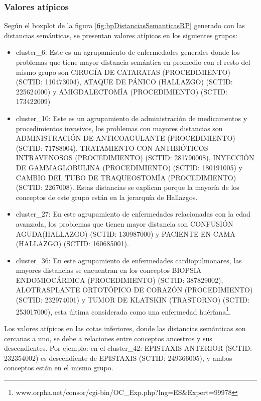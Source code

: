 \subsubsection{Valores atípicos}
Según el boxplot de la figura \ref{fig:bpDistanciasSemanticasRP} generado con las distancias semánticas, se presentan valores atípicos en los siguientes grupos:
\begin{itemize}
\item cluster\_6: Este es un agrupamiento de enfermedades generales donde los problemas que tiene mayor distancia semántica en promedio con el resto del mismo grupo son CIRUGÍA DE CATARATAS (PROCEDIMIENTO) (SCTID: 110473004),  ATAQUE DE PÁNICO (HALLAZGO) (SCTID: 225624000) y AMIGDALECTOMÍA (PROCEDIMIENTO) (SCTID: 173422009)
\item cluster\_10: Este es un agrupamiento de administración de medicamentos y procedimientos invasivos, los problemas con mayores distancias son ADMINISTRACIÓN DE ANTICOAGULANTE (PROCEDIMIENTO) (SCTID: 71788004), TRATAMIENTO CON ANTIBIÓTICOS INTRAVENOSOS (PROCEDIMIENTO) (SCTID: 281790008),  INYECCIÓN DE GAMMAGLOBULINA (PROCEDIMIENTO) (SCTID: 180191005) y CAMBIO DEL TUBO DE TRAQUEOSTOMÍA (PROCEDIMIENTO)  (SCTID: 2267008). Estas distancias se explican porque la mayoría de los conceptos de este grupo están en la jerarquía de Hallazgos.
\item cluster\_27: En este agrupamiento de enfermedades relacionadas con la edad avanzada, los problemas que tienen mayor distancia son CONFUSIÓN AGUDA(HALLAZGO) (SCTID: 130987000) y PACIENTE EN CAMA (HALLAZGO) (SCTID: 160685001).
\item cluster\_36: En este agrupamiento de enfermedades cardiopulmonares, las mayores distancias se encuentran en los  conceptos BIOPSIA ENDOMIOCÁRDICA (PROCEDIMIENTO) (SCTID: 387829002), ALOTRASPLANTE ORTOTÓPICO DE CORAZÓN (PROCEDIMIENTO) (SCTID: 232974001) y TUMOR DE KLATSKIN (TRASTORNO) (SCTID: 253017000), esta última considerada como una enfermedad huérfana\footnote{www.orpha.net/consor/cgi-bin/OC\_Exp.php?lng=ES\&Expert=99978}.
\end{itemize}

Los valores atípicos en las cotas inferiores, donde las distancias semánticas son cercanas a uno,  se debe a relaciones entre conceptos ancestros y sus descendientes. Por ejemplo: en el cluster\_42: EPISTAXIS ANTERIOR (SCTID: 232354002) es descendiente de EPISTAXIS (SCTID: 249366005), y ambos conceptos están en el mismo grupo.

